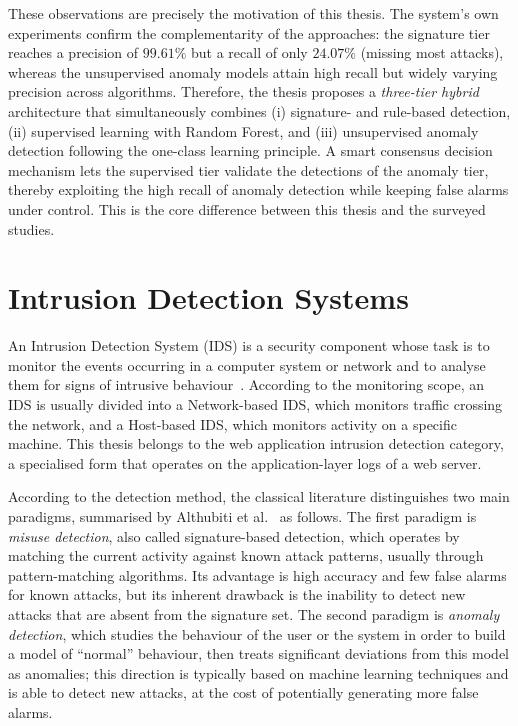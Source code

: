 These observations are precisely the motivation of this thesis. The
system's own experiments confirm the complementarity of the approaches:
the signature tier reaches a precision of $99.61\%$ but a recall of only
$24.07\%$ (missing most attacks), whereas the unsupervised anomaly models
attain high recall but widely varying precision across algorithms.
Therefore, the thesis proposes a \emph{three-tier hybrid} architecture
that simultaneously combines (i) signature- and rule-based detection,
(ii) supervised learning with Random Forest, and (iii) unsupervised
anomaly detection following the one-class learning principle. A smart
consensus decision mechanism lets the supervised tier validate the
detections of the anomaly tier, thereby exploiting the high recall of
anomaly detection while keeping false alarms under control. This is the
core difference between this thesis and the surveyed studies.

\section{Intrusion Detection Systems}
\label{sec:ids}

An Intrusion Detection System (IDS) is a security component whose task is
to monitor the events occurring in a computer system or network and to
analyse them for signs of intrusive behaviour~\cite{tsai2009}. According to
the monitoring scope, an IDS is usually divided into a Network-based IDS,
which monitors traffic crossing the network, and a Host-based IDS, which
monitors activity on a specific machine. This thesis belongs to the web
application intrusion detection category, a specialised form that operates
on the application-layer logs of a web server.

According to the detection method, the classical literature distinguishes
two main paradigms, summarised by Althubiti et al.~\cite{althubiti2017} as
follows. The first paradigm is \emph{misuse detection}, also called
signature-based detection, which operates by matching the current activity
against known attack patterns, usually through pattern-matching
algorithms. Its advantage is high accuracy and few false alarms for known
attacks, but its inherent drawback is the inability to detect new attacks
that are absent from the signature set. The second paradigm is
\emph{anomaly detection}, which studies the behaviour of the user or the
system in order to build a model of ``normal'' behaviour, then treats
significant deviations from this model as anomalies; this direction is
typically based on machine learning techniques and is able to detect new
attacks, at the cost of potentially generating more false alarms.

